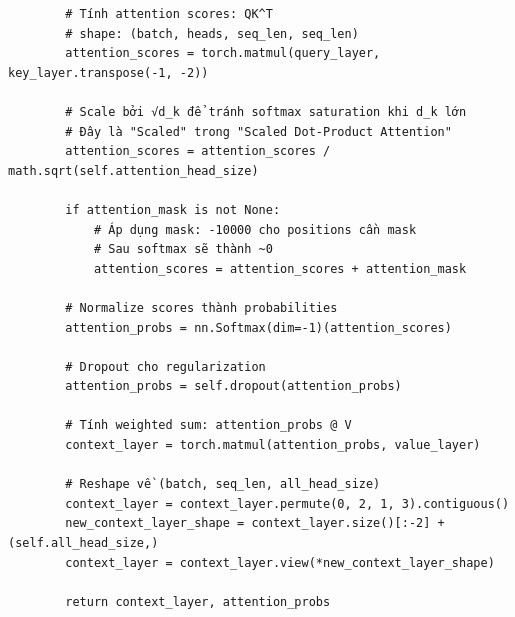 \begin{verbatim}
        # Tính attention scores: QK^T
        # shape: (batch, heads, seq_len, seq_len)
        attention_scores = torch.matmul(query_layer, key_layer.transpose(-1, -2))
        
        # Scale bởi √d_k để tránh softmax saturation khi d_k lớn
        # Đây là "Scaled" trong "Scaled Dot-Product Attention"
        attention_scores = attention_scores / math.sqrt(self.attention_head_size)

        if attention_mask is not None:
            # Áp dụng mask: -10000 cho positions cần mask
            # Sau softmax sẽ thành ~0
            attention_scores = attention_scores + attention_mask

        # Normalize scores thành probabilities
        attention_probs = nn.Softmax(dim=-1)(attention_scores)
        
        # Dropout cho regularization
        attention_probs = self.dropout(attention_probs)

        # Tính weighted sum: attention_probs @ V
        context_layer = torch.matmul(attention_probs, value_layer)

        # Reshape về (batch, seq_len, all_head_size)
        context_layer = context_layer.permute(0, 2, 1, 3).contiguous()
        new_context_layer_shape = context_layer.size()[:-2] + (self.all_head_size,)
        context_layer = context_layer.view(*new_context_layer_shape)

        return context_layer, attention_probs
\end{verbatim}

